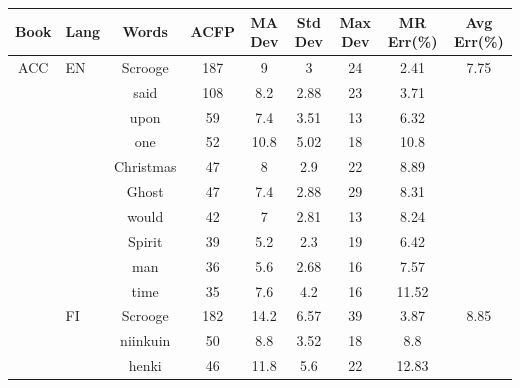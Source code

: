 \documentclass[shortpaper]{revdetua}
\begin{document}
\begin{table}[H]
\centering
\begin{tabular}{@{}ccccccccc@{}}
\toprule
\textbf{Book} & \multicolumn{1}{l|}{\textbf{Lang}} & \textbf{Words} & \textbf{ACFP} & \textbf{MA Dev} & \textbf{Std Dev} & \textbf{Max Dev} & \textbf{MR Err(\%)} & \textbf{Avg Err(\%)} \\ \midrule
ACC  & \multicolumn{1}{l|}{EN} & Scrooge     & 187          & 9            & 3       & 24      & 2.41              & 7.75         \\
     & \multicolumn{1}{l|}{}   & said        & 108          & 8.2          & 2.88    & 23      & 3.71              &              \\
     & \multicolumn{1}{l|}{}   & upon        & 59           & 7.4          & 3.51    & 13      & 6.32              &              \\
     & \multicolumn{1}{l|}{}   & one         & 52           & 10.8         & 5.02    & 18      & 10.8              &              \\
     & \multicolumn{1}{l|}{}   & Christmas   & 47           & 8            & 2.9     & 22      & 8.89              &              \\
     & \multicolumn{1}{l|}{}   & Ghost       & 47           & 7.4          & 2.88    & 29      & 8.31              &              \\
     & \multicolumn{1}{l|}{}   & would       & 42           & 7            & 2.81    & 13      & 8.24              &              \\
     & \multicolumn{1}{l|}{}   & Spirit      & 39           & 5.2          & 2.3     & 19      & 6.42              &              \\
     & \multicolumn{1}{l|}{}   & man         & 36           & 5.6          & 2.68    & 16      & 7.57              &              \\
     & \multicolumn{1}{l|}{}   & time        & 35           & 7.6          & 4.2     & 16      & 11.52             &              \\ \cmidrule(l){2-9} 
     & \multicolumn{1}{l|}{FI} & Scrooge     & 182          & 14.2         & 6.57    & 39      & 3.87              & 8.85         \\
     & \multicolumn{1}{l|}{}   & niinkuin    & 50           & 8.8          & 3.52    & 18      & 8.8               &              \\
     & \multicolumn{1}{l|}{}   & henki       & 46           & 11.8         & 5.6     & 22      & 12.83             &              \\

\end{tabular}
\end{table}
\end{document}
